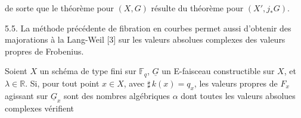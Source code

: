 \begin{center}
\end{center}

de sorte que le théorème pour $(X,G)$ résulte du théorème pour $(X',j_*G)$.

5.5. La méthode précédente de fibration en courbes permet aussi d'obtenir des majorations à la Lang-Weil [3] sur les valeurs absolues complexes des valeurs propres de Frobenius.

Soient $X$ un schéma de type fini sur $\mathbb{F}_q$, $\underline{G}$ un E-faisceau constructible sur $X$, et $\lambda \in \mathbb{R}$. Si, pour tout point $x \in X$, avec $\sharp\, k(x) = q_x$, les valeurs propres de $F_x$ agissant sur $\underline{G}_x$ sont des nombres algébriques $\alpha$ dont toutes les valeurs absolues complexes vérifient

